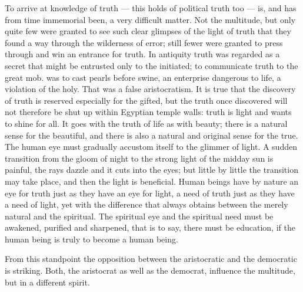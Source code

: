 \documentclass[12pt,a4paper,openany]{book}
\newcommand{\opage}[1]{\marginnote{\footnotesize\textit{[#1]}}}
\begin{document}
To arrive at knowledge of truth --- this holds
of political truth too --- is, and has from time
immemorial been, a very difficult matter. Not the multitude, but
only quite few were granted to see such clear glimpses
of the light of truth that they found a way through the wilderness %
of error; still fewer were granted to press
through and win an entrance for truth. In antiquity
truth was regarded as a secret that might be entrusted
only to the initiated; to communicate truth to the great mob.
was to cast pearls before swine, an enterprise dangerous to life,
\setcounter{footnote}{0}%
\opage{81}a violation of the holy. That was a false aristocratism.
It is true that the discovery of truth is reserved especially for
the gifted, but the truth once discovered will
not therefore be shut up within Egyptian temple walls:
truth is light and wants to shine for all. It goes with
the truth of life as with beauty; there is a natural
sense for the beautiful, and there is also a natural
and original sense for the true. The human
eye must gradually accustom itself to the glimmer of light.
A sudden transition from the gloom of night to the strong
light of the midday sun is painful, the rays dazzle and
it cuts into the eyes; but little by little the transition
may take place, and then the light is beneficial. Human beings
have by nature an eye for truth just as they have
an eye for light, a need of truth just as they have
a need of light, yet with the difference that always
obtains between the merely natural and the spiritual.
The spiritual eye and the spiritual need must be
awakened, purified and sharpened, that is to say, there must be
education, if the human being is truly to become
a human being.

From this standpoint the opposition between the
aristocratic and the democratic is striking. Both,
the aristocrat as well as the democrat, influence the multitude,
but in a different spirit.
\end{document}
